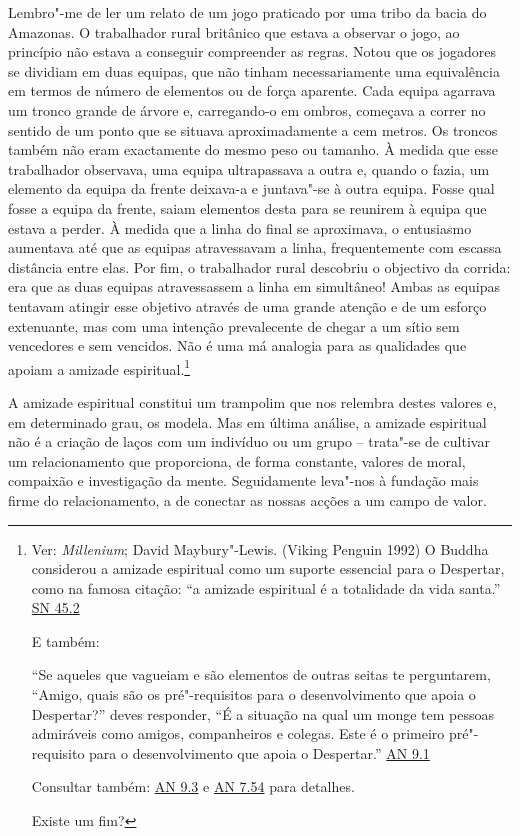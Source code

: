 Lembro"-me de ler um relato de um jogo praticado por uma tribo da bacia do Amazonas. O trabalhador rural britânico que estava a observar o jogo, ao princípio não estava a conseguir compreender as regras. Notou que os jogadores se dividiam em duas equipas, que não tinham necessariamente uma equivalência em termos de número de elementos ou de força aparente. Cada equipa agarrava um tronco grande de árvore e, carregando-o em ombros, começava a correr no sentido de um ponto que se situava aproximadamente a cem metros. Os troncos também não eram exactamente do mesmo peso ou tamanho. À medida que esse trabalhador observava, uma equipa ultrapassava a outra e, quando o fazia, um elemento da equipa da frente deixava-a e juntava"-se à outra equipa. Fosse qual fosse a equipa da frente, saiam elementos desta para se reunirem à equipa que estava a perder. À medida que a linha do final se aproximava, o entusiasmo aumentava até que as equipas atravessavam a linha, frequentemente com escassa distância entre elas. Por fim, o trabalhador rural descobriu o objectivo da corrida: era que as duas equipas atravessassem a linha em simultâneo! Ambas as equipas tentavam atingir esse objetivo através de uma grande atenção e de um esforço extenuante, mas com uma intenção prevalecente de chegar a um sítio sem vencedores e sem vencidos. Não é uma má analogia para as qualidades que apoiam a amizade espiritual.\footnote{Ver: \emph{Millenium}; David Maybury"-Lewis. (Viking Penguin 1992) O Buddha considerou a amizade espiritual como um suporte essencial para o Despertar, como na famosa citação: ``a amizade espiritual é a totalidade da vida santa.'' \href{https://suttacentral.net/sn45.2/en/bodhi}{SN 45.2}

  E também:

  ``Se aqueles que vagueiam e são elementos de outras seitas te perguntarem, ``Amigo, quais são os pré"-requisitos para o desenvolvimento que apoia o Despertar?'' deves responder, ``É a situação na qual um monge tem pessoas admiráveis como amigos, companheiros e colegas. Este é o primeiro pré"-requisito para o desenvolvimento que apoia o Despertar.'' \href{https://suttacentral.net/an9.1/en/thanissaro}{AN 9.1}

  Consultar também: \href{https://suttacentral.net/an9.3/en/sujato}{AN 9.3} e \href{https://suttacentral.net/an7.54/en/thanissaro}{AN 7.54} para detalhes.

  Existe um fim?}

A amizade espiritual constitui um trampolim que nos relembra destes valores e, em determinado grau, os modela. Mas em última análise, a amizade espiritual não é a criação de laços com um indivíduo ou um grupo -- trata"-se de cultivar um relacionamento que proporciona, de forma constante, valores de moral, compaixão e investigação da mente. Seguidamente leva"-nos à fundação mais firme do relacionamento, a de conectar as nossas acções a um campo de valor.

